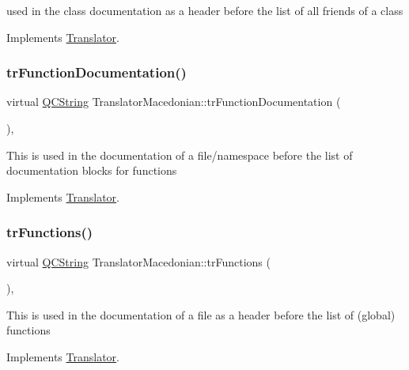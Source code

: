 used in the class documentation as a header before the list of all friends of a class 

Implements \mbox{\hyperlink{class_translator}{Translator}}.

\mbox{\label{class_translator_macedonian_a99cec20507da5201c4d433fed6c5f427}} 
\subsubsection{\texorpdfstring{trFunctionDocumentation()}{trFunctionDocumentation()}}
{\footnotesize\ttfamily virtual \mbox{\hyperlink{class_q_c_string}{Q\+C\+String}} Translator\+Macedonian\+::tr\+Function\+Documentation (\begin{DoxyParamCaption}{ }\end{DoxyParamCaption})\hspace{0.3cm}{\ttfamily [inline]}, {\ttfamily [virtual]}}

This is used in the documentation of a file/namespace before the list of documentation blocks for functions 

Implements \mbox{\hyperlink{class_translator}{Translator}}.

\mbox{\label{class_translator_macedonian_a5ea38ffa2601da6ef933b2d68c050b37}} 
\subsubsection{\texorpdfstring{trFunctions()}{trFunctions()}}
{\footnotesize\ttfamily virtual \mbox{\hyperlink{class_q_c_string}{Q\+C\+String}} Translator\+Macedonian\+::tr\+Functions (\begin{DoxyParamCaption}{ }\end{DoxyParamCaption})\hspace{0.3cm}{\ttfamily [inline]}, {\ttfamily [virtual]}}

This is used in the documentation of a file as a header before the list of (global) functions 

Implements \mbox{\hyperlink{class_translator}{Translator}}.

